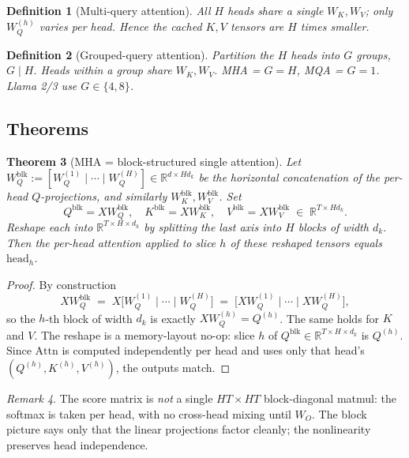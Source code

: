 \documentclass[11pt]{article}
\newtheorem{theorem}{Theorem}[section]
\newtheorem{definition}[theorem]{Definition}
\theoremstyle{remark}
\newtheorem{remark}[theorem]{Remark}
\begin{document}
\begin{definition}[Multi-query attention]
All $H$ heads share a single $W_K, W_V$; only $W_Q^{(h)}$ varies per head. Hence the cached $K,V$ tensors are $H$ times smaller.
\end{definition}

\begin{definition}[Grouped-query attention]
Partition the $H$ heads into $G$ groups, $G \mid H$. Heads within a group share $W_K, W_V$. MHA = $G = H$, MQA = $G = 1$. Llama 2/3 use $G \in \{4, 8\}$.
\end{definition}

\subsection*{Theorems}

\begin{theorem}[MHA = block-structured single attention]
\label{thm:block}
Let $W_Q^{\mathrm{blk}} := [W_Q^{(1)} \mid \cdots \mid W_Q^{(H)}] \in \mathbb{R}^{d \times H d_k}$ be the horizontal concatenation of the per-head $Q$-projections, and similarly $W_K^{\mathrm{blk}}, W_V^{\mathrm{blk}}$. Set
\[
Q^{\mathrm{blk}} = X W_Q^{\mathrm{blk}}, \quad K^{\mathrm{blk}} = X W_K^{\mathrm{blk}}, \quad V^{\mathrm{blk}} = X W_V^{\mathrm{blk}} \;\in\; \mathbb{R}^{T \times H d_k}.
\]
Reshape each into $\mathbb{R}^{T \times H \times d_k}$ by splitting the last axis into $H$ blocks of width $d_k$. Then the per-head attention applied to slice $h$ of these reshaped tensors equals $\mathrm{head}_h$.
\end{theorem}
\begin{proof}
By construction
\[
X W_Q^{\mathrm{blk}} \;=\; X \bigl[W_Q^{(1)} \mid \cdots \mid W_Q^{(H)}\bigr] \;=\; \bigl[X W_Q^{(1)} \mid \cdots \mid X W_Q^{(H)}\bigr],
\]
so the $h$-th block of width $d_k$ is exactly $X W_Q^{(h)} = Q^{(h)}$. The same holds for $K$ and $V$. The reshape is a memory-layout no-op: slice $h$ of $Q^{\mathrm{blk}} \in \mathbb{R}^{T \times H \times d_k}$ is $Q^{(h)}$. Since $\mathrm{Attn}$ is computed independently per head and uses only that head's $(Q^{(h)}, K^{(h)}, V^{(h)})$, the outputs match.
\end{proof}

\begin{remark}
The score matrix is \emph{not} a single $HT \times HT$ block-diagonal matmul: the softmax is taken per head, with no cross-head mixing until $W_O$. The block picture says only that the linear projections factor cleanly; the nonlinearity preserves head independence.
\end{remark}
\end{document}
